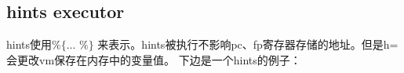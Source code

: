 \subsection{hints executor}\label{subsec: processor-hints-executor}
hints使用$\texttt{\%\{ ... \%\}}$ 来表示。hints被执行不影响pc、fp寄存器存储的地址。但是h=会更改vm保存在内存中的变量值。
下边是一个hints的例子：
